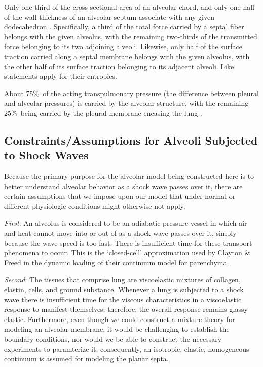 Only one-third of the cross-sectional area of an alveolar chord, and only one-half of the wall thickness of an alveolar septum associate with any given dodecahedron \cite{Kimmeletal87}.  Specifically, a third of the total force carried by a septal fiber belongs with the  given alveolus, with the remaining two-thirds of the transmitted force belonging to its two adjoining alveoli.  Likewise, only half of the surface traction carried along a septal membrane belongs with the given alveolus, with the other half of its surface traction belonging to its adjacent alveoli.  Like statements apply for their entropies.

About 75\%\ of the acting transpulmonary pressure (the difference between pleural and alveolar pressures) is carried by the alveolar structure, with the remaining 25\%\ being carried by the pleural membrane encasing the lung \cite{Hajjietal79}.

\subsection{Constraints\slash Assumptions for Alveoli Subjected to Shock Waves}

Because the primary purpose for the alveolar model being constructed here is to better understand alveolar behavior as a shock wave passes over it, there are certain assumptions that we impose upon our model that under normal or different physiologic conditions might otherwise not apply.  

\textit{First\/}: An alveolus is considered to be an adiabatic pressure vessel in which air and heat cannot move into or out of as a shock wave passes over it, simply because the wave speed is too fast.  There is insufficient time for these transport phenomena to occur.  This is the `closed-cell' approximation used by Clayton \& Freed \cite{ClaytonFreed20} in the dynamic loading of their continuum model for parenchyma.

\textit{Second\/}: The tissues that comprise lung are visco\-elastic \cite{Hildebrandt69,HoppinHildebrandt77} mixtures of collagen, elastin, cells, and ground substance. \cite{RoanWaters11,Sukietal11}  Whenever a lung is subjected to a shock wave there is insufficient time for the viscous characteristics in a visco\-elastic response to manifest themselves; therefore, the overall response remains glassy elastic.  Furthermore, even though we could construct a mixture theory for modeling an alveolar membrane, it would be challenging to establish the boundary conditions, nor would we be able to construct the necessary experiments to paramterize it; consequently, an isotropic, elastic, homogeneous continuum is assumed for modeling the planar septa.

